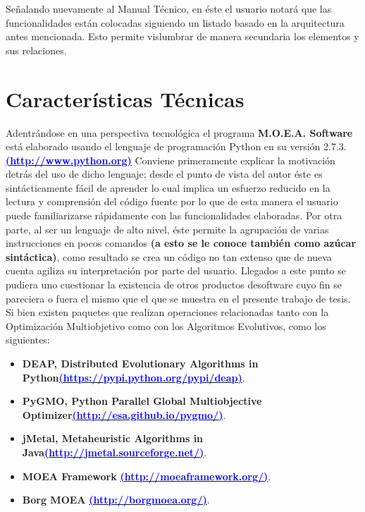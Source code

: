 \documentclass[class=report, crop=false]{standalone}
\begin{document}
Señalando nuevamente al Manual Técnico, en éste el usuario notará 
que las funcionalidades están colocadas siguiendo un listado 
basado en la arquitectura antes mencionada.\break
Esto permite vislumbrar de manera secundaria los elementos y 
sus relaciones.

\section{Características Técnicas}
\label{sec:c1_2}
Adentrándose en una perspectiva tecnológica el programa 
\textbf{M.O.E.A. Software} está elaborado usando el lenguaje 
de programación Python en su versión 2.7.3. 
\textbf{\href{http://www.python.org}{\break\textcolor{blue}{(http://www.python.org)}}}\medskip\break
Conviene primeramente explicar la motivación detrás del uso de 
dicho lenguaje; desde el punto de vista del autor éste es 
sintácticamente fácil de aprender lo cual implica un esfuerzo 
reducido en la lectura y comprensión del código fuente por 
lo que de esta manera el usuario puede familiarizarse 
rápidamente con las funcionalidades elaboradas.\break
Por otra parte, al ser un lenguaje de alto nivel, éste permite 
la agrupación de varias instrucciones en pocos comandos 
\textbf{(a esto se le conoce también como azúcar sintáctica)}, 
como resultado se crea un código no tan extenso que de nueva 
cuenta agiliza su interpretación  por parte del usuario.\medskip\break
Llegados a este punto se pudiera uno cuestionar la existencia 
de otros productos desoftware cuyo fin se pareciera o fuera 
el mismo que el que se muestra en el presente trabajo de tesis.\break
Si bien existen paquetes que realizan operaciones relacionadas 
tanto con la Optimización Multiobjetivo como con los Algoritmos 
Evolutivos, como los siguientes:
\begin{itemize}
\item \textbf{DEAP, Distributed Evolutionary Algorithms in Python}\break\textbf{\href{https://pypi.python.org/pypi/deap}{\textcolor{blue}{(https://pypi.python.org/pypi/deap)}}}.
\item \textbf{PyGMO, Python Parallel Global Multiobjective Optimizer}\break\textbf{\href{http://esa.github.io/pygmo/}{\textcolor{blue}{(http://esa.github.io/pygmo/)}}}.
\item \textbf{jMetal, Metaheuristic Algorithms in Java}\break\textbf{\href{http://jmetal.sourceforge.net/}{\textcolor{blue}{(http://jmetal.sourceforge.net/)}}}.
\item \textbf{MOEA Framework} \textbf{\href{http://moeaframework.org/}{\textcolor{blue}{(http://moeaframework.org/)}}}.
\item \textbf{Borg MOEA} \textbf{\href{http://borgmoea.org/}{\textcolor{blue}{(http://borgmoea.org/)}}}.
\end{itemize}
\end{document}
